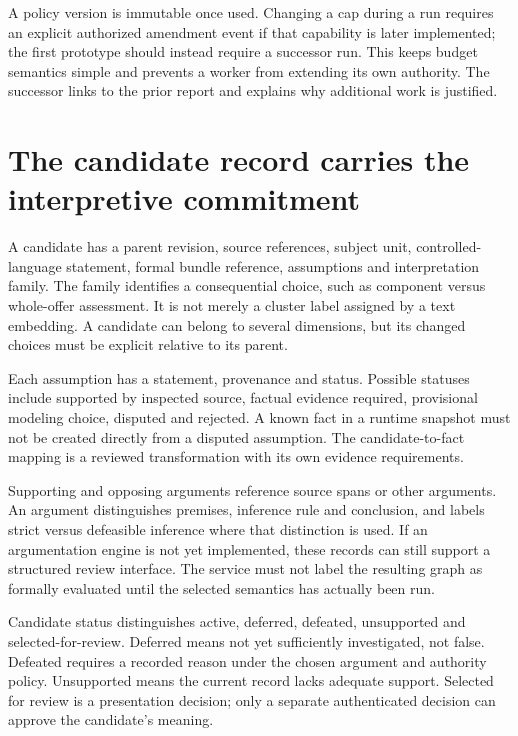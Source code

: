 A policy version is immutable once used. Changing a cap during a run requires an
explicit authorized amendment event if that capability is later implemented;
the first prototype should instead require a successor run. This keeps budget
semantics simple and prevents a worker from extending its own authority. The
successor links to the prior report and explains why additional work is justified.

\section{The candidate record carries the interpretive commitment}
\label{merge:M08:03}


A candidate has a parent revision, source references, subject unit, controlled-
language statement, formal bundle reference, assumptions and interpretation
family. The family identifies a consequential choice, such as component versus
whole-offer assessment. It is not merely a cluster label assigned by a text
embedding. A candidate can belong to several dimensions, but its changed choices
must be explicit relative to its parent.

Each assumption has a statement, provenance and status. Possible statuses include
supported by inspected source, factual evidence required, provisional modeling
choice, disputed and rejected. A known fact in a runtime snapshot must not be
created directly from a disputed assumption. The candidate-to-fact mapping is a
reviewed transformation with its own evidence requirements.

Supporting and opposing arguments reference source spans or other arguments.
An argument distinguishes premises, inference rule and conclusion, and labels
strict versus defeasible inference where that distinction is used. If an
argumentation engine is not yet implemented, these records can still support a
structured review interface. The service must not label the resulting graph as
formally evaluated until the selected semantics has actually been run.


Candidate status distinguishes active, deferred, defeated, unsupported and
selected-for-review. Deferred means not yet sufficiently investigated, not false.
Defeated requires a recorded reason under the chosen argument and authority
policy. Unsupported means the current record lacks adequate support. Selected
for review is a presentation decision; only a separate authenticated decision can
approve the candidate's meaning.

